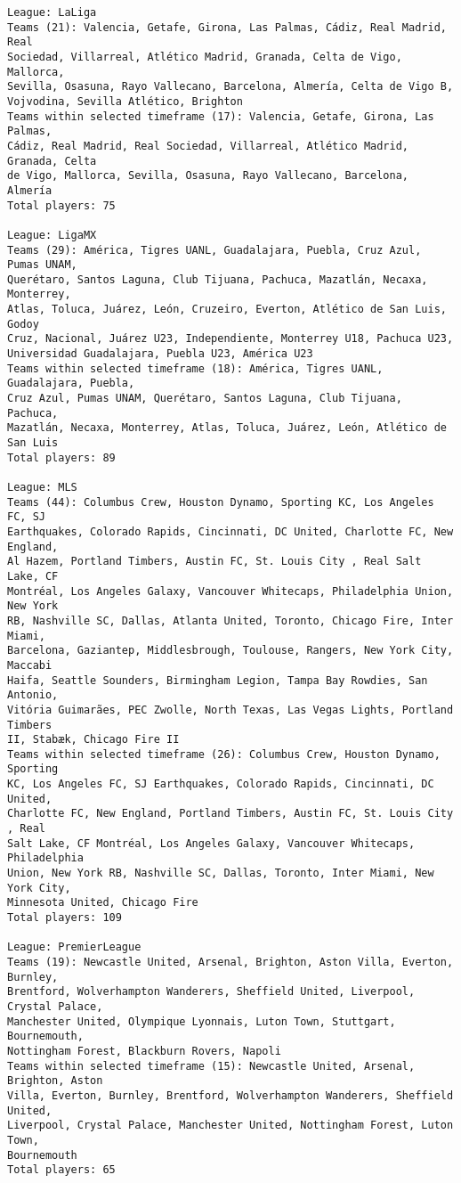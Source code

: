\documentclass[11pt]{article}
\begin{document}
\begin{Verbatim}[commandchars=\\\{\}]
League: LaLiga
Teams (21): Valencia, Getafe, Girona, Las Palmas, Cádiz, Real Madrid, Real
Sociedad, Villarreal, Atlético Madrid, Granada, Celta de Vigo, Mallorca,
Sevilla, Osasuna, Rayo Vallecano, Barcelona, Almería, Celta de Vigo B,
Vojvodina, Sevilla Atlético, Brighton
Teams within selected timeframe (17): Valencia, Getafe, Girona, Las Palmas,
Cádiz, Real Madrid, Real Sociedad, Villarreal, Atlético Madrid, Granada, Celta
de Vigo, Mallorca, Sevilla, Osasuna, Rayo Vallecano, Barcelona, Almería
Total players: 75

League: LigaMX
Teams (29): América, Tigres UANL, Guadalajara, Puebla, Cruz Azul, Pumas UNAM,
Querétaro, Santos Laguna, Club Tijuana, Pachuca, Mazatlán, Necaxa, Monterrey,
Atlas, Toluca, Juárez, León, Cruzeiro, Everton, Atlético de San Luis, Godoy
Cruz, Nacional, Juárez U23, Independiente, Monterrey U18, Pachuca U23,
Universidad Guadalajara, Puebla U23, América U23
Teams within selected timeframe (18): América, Tigres UANL, Guadalajara, Puebla,
Cruz Azul, Pumas UNAM, Querétaro, Santos Laguna, Club Tijuana, Pachuca,
Mazatlán, Necaxa, Monterrey, Atlas, Toluca, Juárez, León, Atlético de San Luis
Total players: 89

League: MLS
Teams (44): Columbus Crew, Houston Dynamo, Sporting KC, Los Angeles FC, SJ
Earthquakes, Colorado Rapids, Cincinnati, DC United, Charlotte FC, New England,
Al Hazem, Portland Timbers, Austin FC, St. Louis City , Real Salt Lake, CF
Montréal, Los Angeles Galaxy, Vancouver Whitecaps, Philadelphia Union, New York
RB, Nashville SC, Dallas, Atlanta United, Toronto, Chicago Fire, Inter Miami,
Barcelona, Gaziantep, Middlesbrough, Toulouse, Rangers, New York City, Maccabi
Haifa, Seattle Sounders, Birmingham Legion, Tampa Bay Rowdies, San Antonio,
Vitória Guimarães, PEC Zwolle, North Texas, Las Vegas Lights, Portland Timbers
II, Stabæk, Chicago Fire II
Teams within selected timeframe (26): Columbus Crew, Houston Dynamo, Sporting
KC, Los Angeles FC, SJ Earthquakes, Colorado Rapids, Cincinnati, DC United,
Charlotte FC, New England, Portland Timbers, Austin FC, St. Louis City , Real
Salt Lake, CF Montréal, Los Angeles Galaxy, Vancouver Whitecaps, Philadelphia
Union, New York RB, Nashville SC, Dallas, Toronto, Inter Miami, New York City,
Minnesota United, Chicago Fire
Total players: 109

League: PremierLeague
Teams (19): Newcastle United, Arsenal, Brighton, Aston Villa, Everton, Burnley,
Brentford, Wolverhampton Wanderers, Sheffield United, Liverpool, Crystal Palace,
Manchester United, Olympique Lyonnais, Luton Town, Stuttgart, Bournemouth,
Nottingham Forest, Blackburn Rovers, Napoli
Teams within selected timeframe (15): Newcastle United, Arsenal, Brighton, Aston
Villa, Everton, Burnley, Brentford, Wolverhampton Wanderers, Sheffield United,
Liverpool, Crystal Palace, Manchester United, Nottingham Forest, Luton Town,
Bournemouth
Total players: 65


\end{Verbatim}
\end{document}
